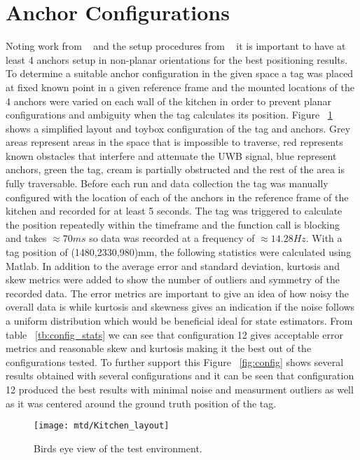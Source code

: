 \section{Anchor Configurations}\label{sec:anchor-configurations}
Noting work from ~\citet{di2019evaluation} and the setup procedures from ~\citet{pozyx2018pozyx} it is important to have at least 4 anchors setup in non-planar orientations for the best positioning results.
To determine a suitable anchor configuration in the given space a tag was placed at fixed known point in a given reference frame and the mounted locations of the 4 anchors were varied on each wall of the kitchen in order to prevent planar configurations and ambiguity when the tag calculates its position.
Figure ~\ref{fig:layout} shows a simplified layout and toybox configuration of the tag and anchors.
Grey areas represent areas in the space that is impossible to traverse, red represents known obstacles that interfere and attenuate the UWB signal, blue represent anchors, green the tag, cream is partially obstructed and the rest of the area is fully traversable.
Before each run and data collection the tag was manually configured with the location of each of the anchors in the reference frame of the kitchen and recorded for at least 5 seconds.
The tag was triggered to calculate the position repeatedly within the timeframe and the function call is blocking and takes $\approx70ms$ so data was recorded at a frequency of $\approx14.28Hz$.
With a tag position of (1480,2330,980)mm, the following statistics were calculated using Matlab.
In addition to the average error and standard deviation,  kurtosis and skew metrics were added to show the number of outliers and symmetry of the recorded data.
The error metrics are important to give an idea of how noisy the overall data is while kurtosis and skewness gives an indication if the noise follows a uniform distribution which would be beneficial ideal for state estimators.
From table ~\ref{tb:config_stats} we can see that configuration 12 gives acceptable error metrics and reasonable skew and kurtosis making it the best out of the configurations tested.
To further support this Figure ~\ref{fig:config} shows several results obtained with several configurations and it can be seen that configuration 12 produced the best results with minimal noise and measurment outliers as well as it was centered around the ground truth position of the tag.

\begin{figure}[h!]
    \centering
    \texttt{[image: mtd/Kitchen\_layout]}
    \caption{Birds eye view of the test environment.}
    \label{fig:layout}
\end{figure}
\newpage

